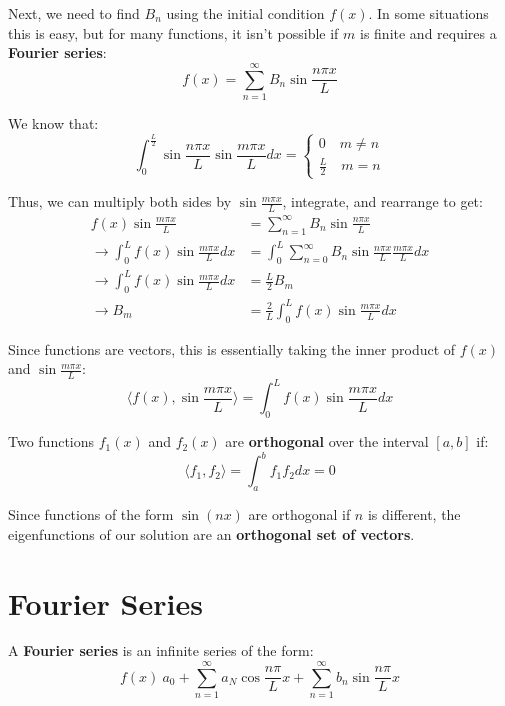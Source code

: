 \documentclass{article}
\begin{document}
Next, we need to find \(B_n\) using the initial condition \(f(x)\). In some situations this is easy, 
but for many functions, it isn't possible if \(m\) is finite  and requires a \textbf{Fourier series}:
\[
     f(x)=\sum_{n=1}^{\infty } B_n \sin{\frac{n \pi x}{L}}
\]

We know that:
\[
    \int_0^{\frac{L}{2}}\sin \frac{n \pi x}{L} \sin\frac{m \pi x}{L} dx = \begin{cases} 0 \quad m\neq n \\ \frac{L}{2} \quad m=n \end{cases}
\] 

Thus, we can multiply both sides by \(\sin \frac{m \pi  x}{L}\), integrate, and rearrange to get:
\begin{align*}
    f(x)\sin\frac{m \pi  x }{L}&=\sum_{n=1}^{\infty} B_n \sin \frac{n \pi  x}{L} \\
    \rightarrow \int_0^L f(x) \sin \frac{m \pi x }{L} dx &= \int _0^L \sum_{n=0}^{\infty} B_n \sin \frac{n \pi x}{L} \frac{m \pi  x}{L} dx \\
    \rightarrow \int_0^L f(x) \sin \frac{m \pi x }{L} dx &= \frac{L}{2} B_m \\
    \rightarrow B_m &= \frac{2}{L} \int_0^L f(x) \sin \frac{m \pi  x}{L} dx
\end{align*}

Since functions are vectors, this is essentially taking the inner product of \(f(x)\) and \(\sin \frac{m \pi  x}{L}\):   
\[
    \langle f(x), \sin \frac{m \pi  x}{L} \rangle = \int_0^L f(x) \sin \frac{m \pi x}{L} dx
\]

\begin{definition}
    Two functions \(f_1(x)\) and \(f_2(x)\) are \textbf{orthogonal} over the interval \([a,b]\) if:
    \[
        \langle f_1, f_2 \rangle = \int_a^b f_1 f_2 dx=0
    \]  
\end{definition}

Since functions of the form \(\sin(nx)\) are orthogonal if \(n\) is different, the eigenfunctions of our solution are an 
\textbf{orthogonal set of vectors}. 

\section{Fourier Series}
\begin{definition}
    A \textbf{Fourier series} is an infinite series of the form:
    \[
        f(x)~ a_0+\sum_{n=1}^{\infty }a_N\cos\frac{n \pi}{L}x+\sum_{n=1}^{\infty }b_n\sin\frac{n \pi }{L}x
    \]
\end{definition}
\end{document}
